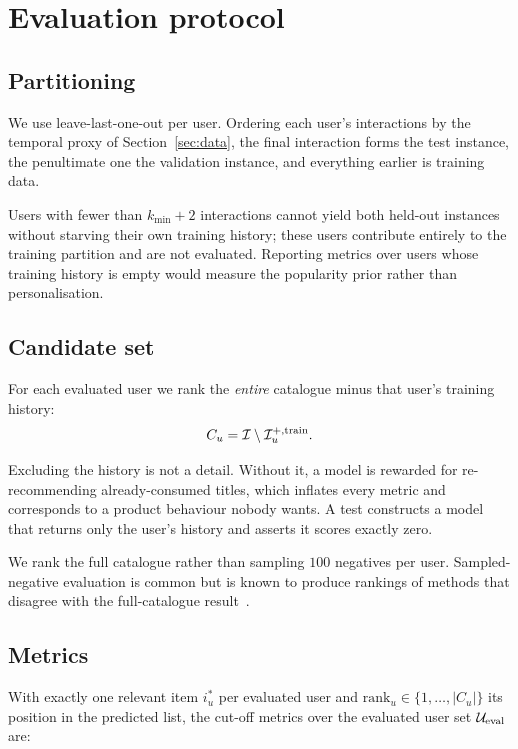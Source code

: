 \section{Evaluation protocol}
\label{sec:evaluation}

\subsection{Partitioning}

We use leave-last-one-out per user. Ordering each user's interactions by the
temporal proxy of Section~\ref{sec:data}, the final interaction forms the test
instance, the penultimate one the validation instance, and everything earlier
is training data.

Users with fewer than $k_{\min} + 2$ interactions cannot yield both held-out
instances without starving their own training history; these users contribute
entirely to the training partition and are not evaluated. Reporting metrics
over users whose training history is empty would measure the popularity prior
rather than personalisation.

\subsection{Candidate set}

For each evaluated user we rank the \emph{entire} catalogue minus that user's
training history:
\begin{equation}
  C_u = \mathcal{I} \setminus \mathcal{I}_u^{+,\text{train}} .
\end{equation}

Excluding the history is not a detail. Without it, a model is rewarded for
re-recommending already-consumed titles, which inflates every metric and
corresponds to a product behaviour nobody wants. A test constructs a model
that returns only the user's history and asserts it scores exactly zero.

We rank the full catalogue rather than sampling $100$ negatives per user.
Sampled-negative evaluation is common but is known to produce rankings of
methods that disagree with the full-catalogue result~\cite{krichene2020}.

\subsection{Metrics}

With exactly one relevant item $i^{*}_u$ per evaluated user and
$\mathrm{rank}_u \in \{1, \dots, |C_u|\}$ its position in the predicted list,
the cut-off metrics over the evaluated user set $\mathcal{U}_{\text{eval}}$ are:

